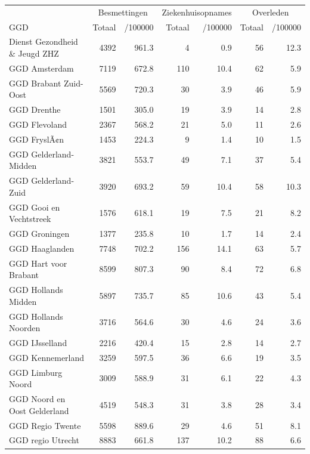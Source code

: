 \documentclass[
  english,
  man,floatsintext]{apa6}
\begin{document}
\begin{table}[H]
\centering\begingroup\fontsize{10}{12}\selectfont

\begin{threeparttable}
\begin{tabular}{lrrrrrr}
\toprule
\multicolumn{1}{c}{ } & \multicolumn{2}{c}{Besmettingen} & \multicolumn{2}{c}{Ziekenhuisopnames} & \multicolumn{2}{c}{Overleden} \\
\cmidrule(l{3pt}r{3pt}){2-3} \cmidrule(l{3pt}r{3pt}){4-5} \cmidrule(l{3pt}r{3pt}){6-7}
GGD & Totaal & /100000 & Totaal & /100000 & Totaal & /100000\\
\midrule
Dienst Gezondheid \& Jeugd ZHZ & 4392 & 961.3 & 4 & 0.9 & 56 & 12.3\\
GGD Amsterdam & 7119 & 672.8 & 110 & 10.4 & 62 & 5.9\\
GGD Brabant Zuid-Oost & 5569 & 720.3 & 30 & 3.9 & 46 & 5.9\\
GGD Drenthe & 1501 & 305.0 & 19 & 3.9 & 14 & 2.8\\
GGD Flevoland & 2367 & 568.2 & 21 & 5.0 & 11 & 2.6\\
GGD FryslÃ¢n & 1453 & 224.3 & 9 & 1.4 & 10 & 1.5\\
GGD Gelderland-Midden & 3821 & 553.7 & 49 & 7.1 & 37 & 5.4\\
GGD Gelderland-Zuid & 3920 & 693.2 & 59 & 10.4 & 58 & 10.3\\
GGD Gooi en Vechtstreek & 1576 & 618.1 & 19 & 7.5 & 21 & 8.2\\
GGD Groningen & 1377 & 235.8 & 10 & 1.7 & 14 & 2.4\\
GGD Haaglanden & 7748 & 702.2 & 156 & 14.1 & 63 & 5.7\\
GGD Hart voor Brabant & 8599 & 807.3 & 90 & 8.4 & 72 & 6.8\\
GGD Hollands Midden & 5897 & 735.7 & 85 & 10.6 & 43 & 5.4\\
GGD Hollands Noorden & 3716 & 564.6 & 30 & 4.6 & 24 & 3.6\\
GGD IJsselland & 2216 & 420.4 & 15 & 2.8 & 14 & 2.7\\
GGD Kennemerland & 3259 & 597.5 & 36 & 6.6 & 19 & 3.5\\
GGD Limburg Noord & 3009 & 588.9 & 31 & 6.1 & 22 & 4.3\\
GGD Noord en Oost Gelderland & 4519 & 548.3 & 31 & 3.8 & 28 & 3.4\\
GGD Regio Twente & 5598 & 889.6 & 29 & 4.6 & 51 & 8.1\\
GGD regio Utrecht & 8883 & 661.8 & 137 & 10.2 & 88 & 6.6\\

\end{tabular}
\end{threeparttable}
\end{table}
\end{document}

